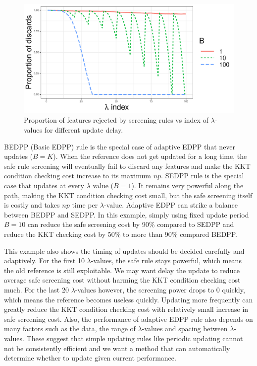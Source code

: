 \begin{figure}[H]
    \centering
    \includegraphics[scale = 0.6]{plots/batchsizes.pdf}    \caption{Proportion of features rejected by screening rules vs index of $\lambda$-values for different update delay.}
    \label{fig:3.4.1}
\end{figure}

BEDPP (Basic EDPP) rule is the special case of adaptive EDPP that never updates ($B=K$). When the reference does not get updated for a long time, the safe rule screening will eventually fail to discard any features and make the KKT condition checking cost increase to its maximum $np$. SEDPP rule is the special case that updates at every $\lambda$ value ($B=1$). It remains very powerful along the path, making the KKT condition checking cost small, but the safe screening itself is costly and takes $np$ time per $\lambda$-value. Adaptive EDPP can strike a balance between BEDPP and SEDPP. In this example, simply using fixed update period $B=10$ can reduce the safe screening cost by 90\% compared to SEDPP and reduce the KKT checking cost by 50\% to more than 90\% compared BEDPP.

This example also shows the timing of updates should be decided carefully and adaptively. For the first 10 $\lambda$-values, the safe rule stays powerful, which means the old reference is still exploitable. We may want delay the update to reduce average safe screening cost without harming the KKT condition checking cost much. For the last 20 $\lambda$-values however, the screening power drops to 0 quickly, which means the reference becomes useless quickly. Updating more frequently can greatly reduce the KKT condition checking cost with relatively small increase in safe screening cost. Also, the performance of adaptive EDPP rule also depends on many factors such as the data, the range of $\lambda$-values and spacing between $\lambda$-values. These suggest that simple updating rules like periodic updating cannot not be consistently efficient and we want a method that can automatically determine whether to update given current performance.

